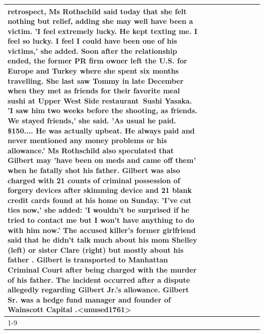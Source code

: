 \begin{table}[H]
\begin{tabular}{lllrlllll}
retrospect, Ms Rothschild said today that she felt nothing but relief, adding she may well have been a victim. 'I feel extremely lucky. He kept texting me. I feel so lucky. I feel I could have been one of his victims,' she added. Soon after the relationship ended, the former PR firm owner left the U.S. for Europe and Turkey where she spent six months  travelling. She last saw Tommy in late December when they met as friends for their favorite meal sushi at Upper West Side restaurant Sushi Yasaka. 'I saw him two weeks before the shooting, as friends. We stayed friends,' she said. 'As usual he paid. \$150.... He was actually upbeat. He always paid and never mentioned any money problems or his allowance.' Ms Rothschild also speculated that Gilbert may 'have been on meds and came off them' when he fatally shot his father. Gilbert was also charged with 21 counts of criminal possession of forgery devices after skimming device and 21 blank credit cards found at his home on Sunday. 'I've cut ties now,' she added: 'I wouldn’t be surprised if he tried to contact me but I won’t have anything to do with him now.' The accused killer's former girlfriend said that he didn't talk much about his mom Shelley (left) or sister Clare (right) but mostly about his father . Gilbert is transported to Manhattan Criminal Court  after being charged with the murder of his father. The incident occurred after a dispute allegedly regarding Gilbert Jr.'s allowance. Gilbert Sr. was a hedge fund manager and founder of Wainscott Capital .<unused1761> \\
\cline{1-9}

\end{tabular}
\end{table}
